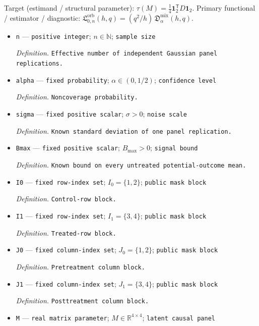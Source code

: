 \documentclass{article}
\begin{document}
Target (estimand / structural parameter): \(\tau(M)=\tfrac14\mathbf 1_2^{\mathsf T}D\mathbf 1_2\).
Primary functional / estimator / diagnostic: \(\mathfrak L_{0,n}^{\mathrm{orb}}(h,q)=(q^2/h)\,\mathfrak D_{\alpha}^{\mathrm{mix}}(h,q)\).
\begin{itemize}
  \item \texttt{n} --- \texttt{positive integer}; \(n\in\mathbb N\); \texttt{sample size}
  \par\smallskip\noindent\emph{Definition.} \texttt{Effective number of independent Gaussian panel replications.}
  \item \texttt{alpha} --- \texttt{fixed probability}; \(\alpha\in(0,1/2)\); \texttt{confidence level}
  \par\smallskip\noindent\emph{Definition.} \texttt{Noncoverage probability.}
  \item \texttt{sigma} --- \texttt{fixed positive scalar}; \(\sigma>0\); \texttt{noise scale}
  \par\smallskip\noindent\emph{Definition.} \texttt{Known standard deviation of one panel replication.}
  \item \texttt{Bmax} --- \texttt{fixed positive scalar}; \(B_{\max}>0\); \texttt{signal bound}
  \par\smallskip\noindent\emph{Definition.} \texttt{Known bound on every untreated potential-\allowbreak{}outcome mean.}
  \item \texttt{I0} --- \texttt{fixed row-\allowbreak{}index set}; \(I_0=\{1,2\}\); \texttt{public mask block}
  \par\smallskip\noindent\emph{Definition.} \texttt{Control-\allowbreak{}row block.}
  \item \texttt{I1} --- \texttt{fixed row-\allowbreak{}index set}; \(I_1=\{3,4\}\); \texttt{public mask block}
  \par\smallskip\noindent\emph{Definition.} \texttt{Treated-\allowbreak{}row block.}
  \item \texttt{J0} --- \texttt{fixed column-\allowbreak{}index set}; \(J_0=\{1,2\}\); \texttt{public mask block}
  \par\smallskip\noindent\emph{Definition.} \texttt{Pretreatment column block.}
  \item \texttt{J1} --- \texttt{fixed column-\allowbreak{}index set}; \(J_1=\{3,4\}\); \texttt{public mask block}
  \par\smallskip\noindent\emph{Definition.} \texttt{Posttreatment column block.}
  \item \texttt{M} --- \texttt{real matrix parameter}; \(M\in\mathbb R^{4\times4}\); \texttt{latent causal panel}

\end{itemize}
\end{document}
